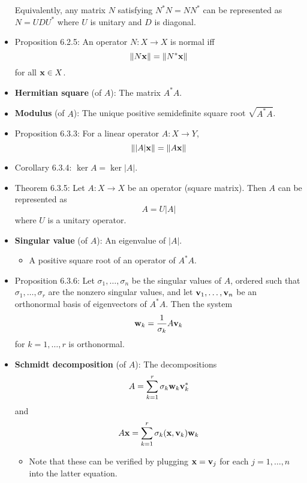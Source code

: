 \documentclass[../../notes.tex]{subfiles}
\begin{document}
\begin{itemize}
    Equivalently, any matrix $N$ satisfying $N^*N=NN^*$ can be represented as $N=UDU^*$ where $U$ is unitary and $D$ is diagonal.
    \item Proposition 6.2.5: An operator $N:X\to X$ is normal iff
    \begin{equation*}
        \norm{N\mathbf{x}} = \norm{N^*\mathbf{x}}
    \end{equation*}
    for all $\mathbf{x}\in X$.
    \item \textbf{Hermitian square} (of $A$): The matrix $A^*A$.
    \item \textbf{Modulus} (of $A$): The unique positive semidefinite square root $\sqrt{A^*A}$.
    \item Proposition 6.3.3: For a linear operator $A:X\to Y$,
    \begin{equation*}
        \norm{|A|\mathbf{x}} = \norm{A\mathbf{x}}
    \end{equation*}
    \item Corollary 6.3.4: $\ker A=\ker|A|$.
    \item Theorem 6.3.5: Let $A:X\to X$ be an operator (square matrix). Then $A$ can be represented as
    \begin{equation*}
        A = U|A|
    \end{equation*}
    where $U$ is a unitary operator.
    \item \textbf{Singular value} (of $A$): An eigenvalue of $|A|$.
    \begin{itemize}
        \item A positive square root of an operator of $A^*A$.
    \end{itemize}
    \item Proposition 6.3.6: Let $\sigma_1,\dots,\sigma_n$ be the singular values of $A$, ordered such that $\sigma_1,\dots,\sigma_r$ are the nonzero singular values, and let $\mathbf{v}_1,\dots,\mathbf{v}_n$ be an orthonormal basis of eigenvectors of $A^*A$. Then the system
    \begin{equation*}
        \mathbf{w}_k = \frac{1}{\sigma_k}A\mathbf{v}_k
    \end{equation*}
    for $k=1,\dots,r$ is orthonormal.
    \item \textbf{Schmidt decomposition} (of $A$): The decompositions
    \begin{equation*}
        A = \sum_{k=1}^r\sigma_k\mathbf{w}_k\mathbf{v}_k^*
    \end{equation*}
    and
    \begin{equation*}
        A\mathbf{x} = \sum_{k=1}^r\sigma_k(\mathbf{x},\mathbf{v}_k)\mathbf{w}_k
    \end{equation*}
    \begin{itemize}
        \item Note that these can be verified by plugging $\mathbf{x}=\mathbf{v}_j$ for each $j=1,\dots,n$ into the latter equation.
    \end{itemize}
\end{itemize}
\end{document}
